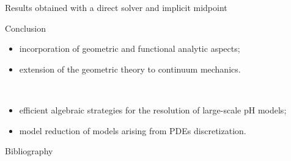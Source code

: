 \documentclass[aspectratio=169]{beamer}
\begin{document}
\begin{frame}{Results obtained with a direct solver and implicit midpoint}
	
	
\end{frame}

\begin{frame}{Conclusion}
	
	\vspace{.3cm}
	\begin{tcolorbox}[nobeforeafter, colframe=theme,title=Analytical developments]%
	\begin{itemize}
		\item incorporation of geometric and functional analytic aspects;
		\item extension of the geometric theory to continuum mechanics.
	\end{itemize}
	\end{tcolorbox} 
	\vspace{.3cm}\\
	\begin{tcolorbox}[nobeforeafter, colframe=theme,title=Application oriented developments]%
	\begin{itemize}
		\item efficient algebraic strategies for the resolution of large-scale pH models;
		\item model reduction of models arising from PDEs discretization.
	\end{itemize}
	\end{tcolorbox}

\end{frame}
	
\begin{frame}{Bibliography}
	\printbibliography
\end{frame}

	\appendix
	
	
	
	
\end{document}
